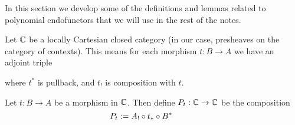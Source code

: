 In this section we develop some of the definitions
and lemmas related to polynomial endofunctors that we will use
in the rest of the notes.

\medskip

\begin{defn}
  \label{defn:UvPoly}
   \leanok
  Let $\mathbb{C}$ be a locally Cartesian closed category
  (in our case, presheaves on the category of contexts).
  This means for each morphism $t : B \to A$ we have an adjoint triple
  \begin{center}\end{center}
  where $t^{*}$ is pullback, and $t_{!}$ is composition with $t$.

  Let $t : B \to A$ be a morphism in $\mathbb{C}$.
  Then define $P_{t} : \mathbb{C} \to \mathbb{C}$ be the composition
  \[
    P_{t} := A_{!} \circ t_{*} \circ B^{*}
    \quad \quad \quad
  \]
  \begin{center}\end{center}
\end{defn}
